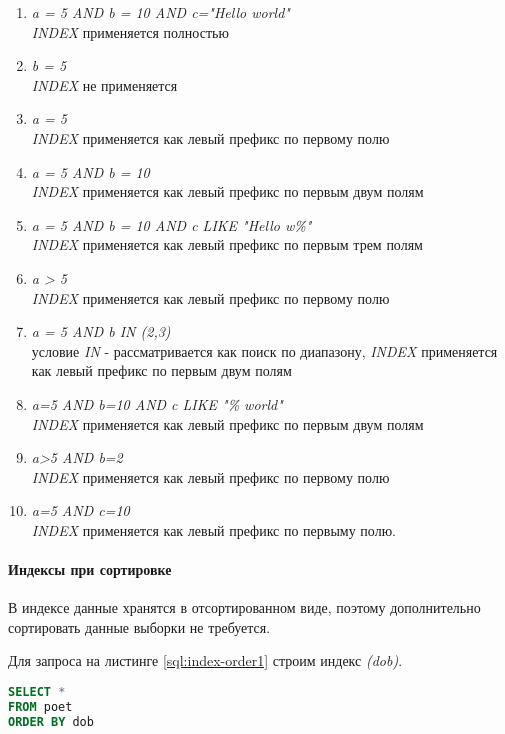 \begin{enumerate}
\item \textit{a = 5 AND b = 10 AND c="Hello world"} \\  \textit{INDEX} применяется полностью
\item \textit{b = 5} \\   \textit{INDEX} не применяется
\item \textit{a = 5} \\  \textit{INDEX} применяется как левый префикс по первому полю
\item \textit{a = 5 AND b = 10} \\  \textit{INDEX} применяется как левый префикс по первым двум полям
\item \textit{a = 5 AND b = 10 AND c LIKE "Hello w\%"}  \\  \textit{INDEX} применяется как левый префикс по первым трем полям
\item \textit{a > 5} \\  \textit{INDEX} применяется как левый префикс по первому полю
\item \textit{a = 5 AND b IN (2,3)} \\ условие \textit{IN} - рассматривается как поиск по диапазону, \textit{INDEX} применяется как левый префикс по первым двум полям
\item \textit{a=5 AND b=10 AND c LIKE "\% world"} \\  \textit{INDEX} применяется как левый префикс по первым двум полям
\item \textit{a>5 AND b=2} \\ \textit{INDEX} применяется как левый префикс по первому полю
\item \textit{a=5 AND c=10} \\ \textit{INDEX} применяется как левый префикс по первыму полю.
\end{enumerate}


\paragraph{Индексы при сортировке}

В индексе данные хранятся в отсортированном виде, поэтому дополнительно сортировать данные выборки не требуется.


Для запроса на листинге \ref{sql:index-order1} строим индекс \textit{(dob)}.

\begin{lstlisting}[language=sql, label=sql:index-order1, caption={запрос для index-order}]
SELECT * 
FROM poet
ORDER BY dob
\end{lstlisting}


